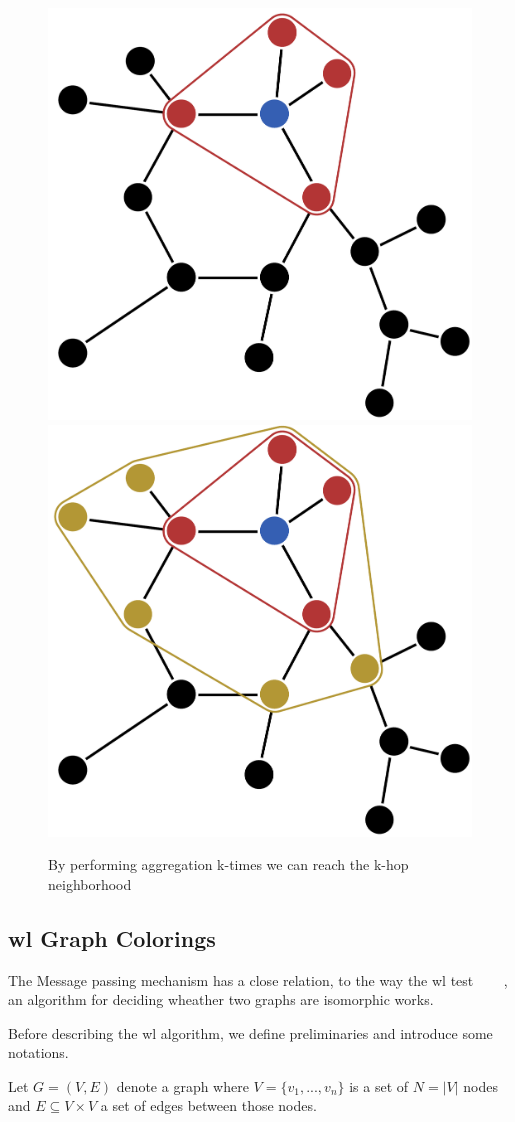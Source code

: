 \begin{figure}[ht]
    \centering
    \includegraphics[width=0.35\linewidth]{gfx/related-work/1hop}\hspace{1cm}
    \includegraphics[width=0.35\linewidth]{gfx/related-work/2hop}
    \caption{By performing aggregation k-times we can reach the k-hop neighborhood}\label{fig:related:1hop}
\end{figure}


\subsection{\acl{wl} Graph Colorings}
\label{sec:related:character:wl}
The Message passing mechanism has a close relation, to the way the \acf{wl} test ~\cite{Weisfeiler1968}
~\cite{Damke2020}~\cite{Huang2022}, an algorithm for deciding wheather two graphs are isomorphic works.

Before describing the \ac{wl} algorithm, we define preliminaries and introduce some notations.
\begin{defn}
    Let $G = (V,E)$ denote a graph where $V =\{v_{1},...,v_{n}\}$ is a set of $ N = |V|$
    nodes and $E \subseteq V\times V $ a set of edges between those nodes.
\end{defn}

